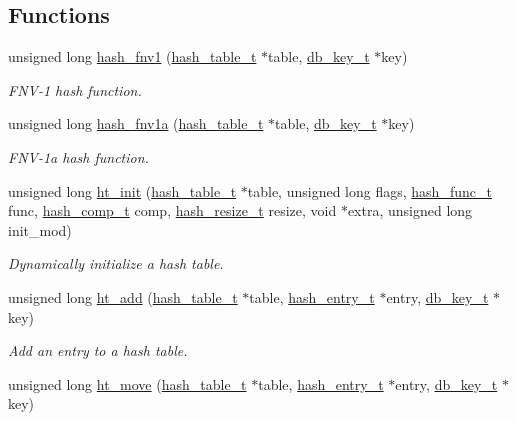 \subsection*{Functions}
\begin{CompactItemize}
\item 
unsigned long \hyperlink{group__dbprim__hash_ga7}{hash\_\-fnv1} (\hyperlink{struct__hash__table__s}{hash\_\-table\_\-t} $\ast$table, \hyperlink{struct__db__key__s}{db\_\-key\_\-t} $\ast$key)
\begin{CompactList}\small\item\em FNV-1 hash function. \item\end{CompactList}\item 
unsigned long \hyperlink{group__dbprim__hash_ga8}{hash\_\-fnv1a} (\hyperlink{struct__hash__table__s}{hash\_\-table\_\-t} $\ast$table, \hyperlink{struct__db__key__s}{db\_\-key\_\-t} $\ast$key)
\begin{CompactList}\small\item\em FNV-1a hash function. \item\end{CompactList}\item 
unsigned long \hyperlink{group__dbprim__hash_ga9}{ht\_\-init} (\hyperlink{struct__hash__table__s}{hash\_\-table\_\-t} $\ast$table, unsigned long flags, \hyperlink{group__dbprim__hash_ga4}{hash\_\-func\_\-t} func, \hyperlink{group__dbprim__hash_ga5}{hash\_\-comp\_\-t} comp, \hyperlink{group__dbprim__hash_ga6}{hash\_\-resize\_\-t} resize, void $\ast$extra, unsigned long init\_\-mod)
\begin{CompactList}\small\item\em Dynamically initialize a hash table. \item\end{CompactList}\item 
unsigned long \hyperlink{group__dbprim__hash_ga10}{ht\_\-add} (\hyperlink{struct__hash__table__s}{hash\_\-table\_\-t} $\ast$table, \hyperlink{struct__hash__entry__s}{hash\_\-entry\_\-t} $\ast$entry, \hyperlink{struct__db__key__s}{db\_\-key\_\-t} $\ast$key)
\begin{CompactList}\small\item\em Add an entry to a hash table. \item\end{CompactList}\item 
unsigned long \hyperlink{group__dbprim__hash_ga11}{ht\_\-move} (\hyperlink{struct__hash__table__s}{hash\_\-table\_\-t} $\ast$table, \hyperlink{struct__hash__entry__s}{hash\_\-entry\_\-t} $\ast$entry, \hyperlink{struct__db__key__s}{db\_\-key\_\-t} $\ast$key)

\end{CompactItemize}
